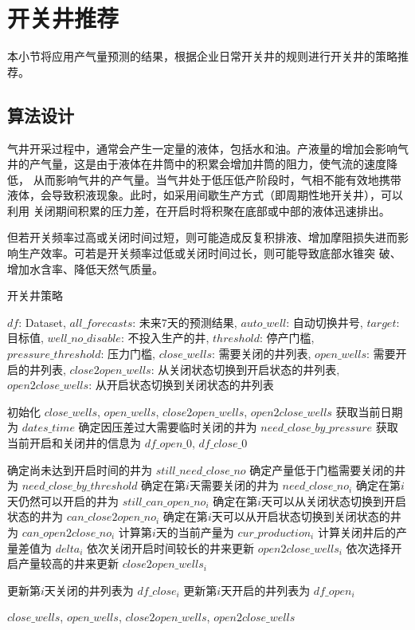 \section{开关井推荐}
本小节将应用产气量预测的结果，根据企业日常开关井的规则进行开关井的策略推荐。
\subsection{算法设计}
气井开采过程中，通常会产生一定量的液体，包括水和油。产液量的增加会影响气井的产气量，这是由于液体在井筒中的积累会增加井筒的阻力，使气流的速度降低，
从而影响气井的产气量。当气井处于低压低产阶段时，气相不能有效地携带液体，会导致积液现象。此时，如采用间歇生产方式（即周期性地开关井），可以利用
关闭期间积累的压力差，在开启时将积聚在底部或中部的液体迅速排出。

但若开关频率过高或关闭时间过短，则可能造成反复积排液、增加摩阻损失进而影响生产效率。可若是开关频率过低或关闭时间过长，则可能导致底部水锥突
破、增加水含率、降低天然气质量。
\begin{algorithm}[H]
    \baselineskip=20pt
    \caption{开关井策略}
    \label{al:openclose}
    \begin{algorithmic}[1]
    \Require $df$: Dataset, $all\_forecasts$: 未来7天的预测结果, $auto\_well$: 自动切换井号, $target$: 目标值, $well\_no\_disable$: 不投入生产的井, $threshold$: 停产门槛, $pressure\_threshold$: 压力门槛,
    \Ensure $close\_wells$: 需要关闭的井列表, $open\_wells$: 需要开启的井列表, $close2open\_wells$: 从关闭状态切换到开启状态的井列表, $open2close\_wells$: 从开启状态切换到关闭状态的井列表
    
    \State 初始化 $close\_wells$, $open\_wells$, $close2open\_wells$, $open2close\_wells$
    \State 获取当前日期为 $dates\_time$
    \State 确定因压差过大需要临时关闭的井为 $need\_close\_by\_pressure$
    \State 获取当前开启和关闭井的信息为 $df\_open\_0$, $df\_close\_0$
    
        \State 确定尚未达到开启时间的井为 $still\_need\_close\_no$
        \State 确定产量低于门槛需要关闭的井为 $need\_close\_by\_threshold$
        \State 确定在第$i$天需要关闭的井为 $need\_close\_no_i$ 
        \State 确定在第$i$天仍然可以开启的井为 $still\_can\_open\_no_i$ 
        \State 确定在第$i$天可以从关闭状态切换到开启状态的井为 $can\_close2open\_no_i$ 
        \State 确定在第$i$天可以从开启状态切换到关闭状态的井为 $can\_open2close\_no_i$ 
        \State 计算第$i$天的当前产量为 $cur\_production_i$
        \State 计算关闭井后的产量差值为 $delta_i$ 
            \State 依次关闭开启时间较长的井来更新 $open2close\_wells_i$
        \Else
            \State 依次选择开启产量较高的井来更新 $close2open\_wells_i$
        \EndIf
        
        \State 更新第$i$天关闭的井列表为 $df\_close_i$
        \State 更新第$i$天开启的井列表为 $df\_open_i$
    \EndFor
    
    \State \Return $close\_wells$, $open\_wells$, $close2open\_wells$, $open2close\_wells$
    
    \end{algorithmic}
  \end{algorithm}

